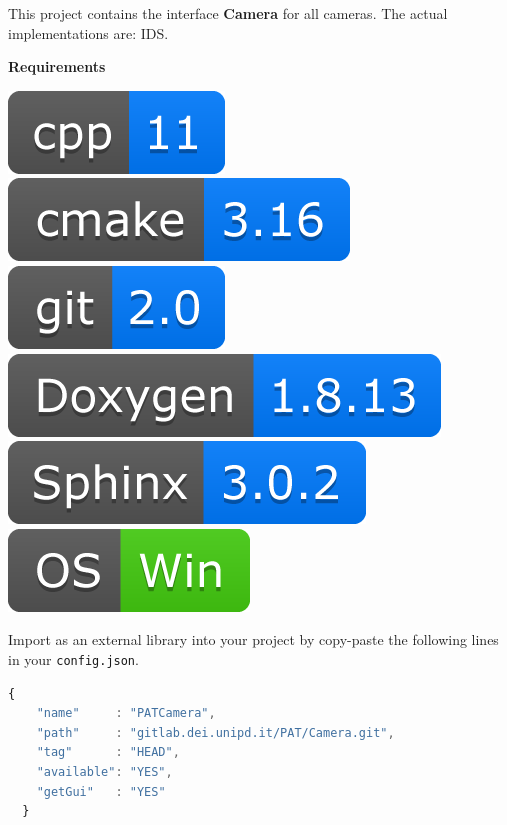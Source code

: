 
This project contains the interface \textbf{Camera} for all cameras. The
actual implementations are: IDS.

\textbf{Requirements}

\includegraphics[scale=0.7]{img/shilds/cpp.png}
\includegraphics[scale=0.7]{img/shilds/cmake.png}
\includegraphics[scale=0.7]{img/shilds/git.png}
\includegraphics[scale=0.7]{img/shilds/doxygen.png}
\includegraphics[scale=0.7]{img/shilds/sphinx.png}
\includegraphics[scale=0.7]{img/shilds/win.png}



Import as an external library into your project by copy-paste the
following lines in your \texttt{config.json}.

\begin{lstlisting}[language=javascript, gobble=2]
  {
    "name"     : "PATCamera",
    "path"     : "gitlab.dei.unipd.it/PAT/Camera.git",
    "tag"      : "HEAD",
    "available": "YES",
    "getGui"   : "YES"
  }
\end{lstlisting}

